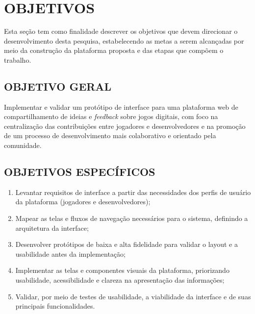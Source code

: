 \chapter{OBJETIVOS} \label{cha:objetivos}


Esta seção tem como finalidade descrever os objetivos que devem direcionar o desenvolvimento desta pesquisa, estabelecendo as metas a serem alcançadas por meio da construção da plataforma proposta e das etapas que compõem o trabalho.

\section{OBJETIVO GERAL}

Implementar e validar um protótipo de interface para uma plataforma web de compartilhamento de ideias e \textit{feedback} sobre jogos digitais, com foco na centralização das contribuições entre jogadores e desenvolvedores e na promoção de um processo de desenvolvimento mais colaborativo e orientado pela comunidade.


\section{OBJETIVOS ESPECÍFICOS}

\begin{enumerate}
    \item  Levantar requisitos de interface a partir das necessidades dos perfis de usuário da plataforma (jogadores e desenvolvedores);

    \item  Mapear as telas e fluxos de navegação necessários para o sistema, definindo a arquitetura da interface; 
    
    \item  Desenvolver protótipos de baixa e alta fidelidade para validar o layout e a usabilidade antes da implementação; 
    
    \item  Implementar as telas e componentes visuais da plataforma, priorizando usabilidade, acessibilidade e clareza na apresentação das informações;
    
    \item  Validar, por meio de testes de usabilidade, a viabilidade da interface e de suas principais funcionalidades. 
\end{enumerate}

